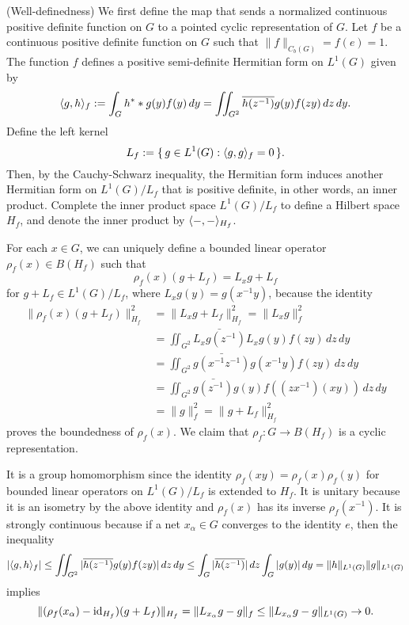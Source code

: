 \documentclass[a4paper]{article}
\begin{document}
\begin{pf}
(Well-definedness)
We first define the map that sends a normalized continuous positive definite function on $G$ to a pointed cyclic representation of $G$.
Let $f$ be a continuous positive definite function on $G$ such that $\|f\|_{C_b(G)}=f(e)=1$.
The function $f$ defines a positive semi-definite Hermitian form on $L^1(G)$ given by
\[\langle g,h\rangle_f:=\int_Gh^**g(y)f(y)\,dy=\iint_{G^2}\overline{h(z^{-1})}g(y)f(zy)\,dz\,dy.\]
Define the left kernel
\[L_f:=\{\,g\in L^1(G):\langle g,g\rangle_f=0\,\}.\]
Then, by the Cauchy-Schwarz inequality, the Hermitian form induces another Hermitian form on $L^1(G)/L_f$ that is positive definite, in other words, an inner product.
Complete the inner product space $L^1(G)/L_f$ to define a Hilbert space $H_f$, and denote the inner product by $\langle-,-\rangle_{H_f}$.

For each $x\in G$, we can uniquely define a bounded linear operator $\rho_f(x)\in B(H_f)$ such that
\[\rho_f(x)(g+L_f)=L_xg+L_f\]
for $g+L_f\in L^1(G)/L_f$, where $L_xg(y)=g(x^{-1}y)$, because the identity
\begin{align*}
\|\rho_f(x)(g+L_f)\|_{H_f}^2&=\|L_xg+L_f\|_{H_f}^2=\|L_xg\|_f^2\\
&=\iint_{G^2}\bar{L_xg(z^{-1})}L_xg(y)f(zy)\,dz\,dy\\
&=\iint_{G^2}\bar{g(x^{-1}z^{-1})}g(x^{-1}y)f(zy)\,dz\,dy\\
&=\iint_{G^2}\bar{g(z^{-1})}g(y)f((zx^{-1})(xy))\,dz\,dy\\
&=\|g\|_f^2=\|g+L_f\|_{H_f}^2
\end{align*}
proves the boundedness of $\rho_f(x)$.
We claim that $\rho_f:G\to B(H_f)$ is a cyclic representation.

It is a group homomorphism since the identity $\rho_f(xy)=\rho_f(x)\rho_f(y)$ for bounded linear operators on $L^1(G)/L_f$ is extended to $H_f$.
It is unitary because it is an isometry by the above identity and $\rho_f(x)$ has its inverse $\rho_f(x^{-1})$.
It is strongly continuous because if a net $x_\alpha\in G$ converges to the identity $e$, then the inequality
\[|\langle g,h\rangle_f|\le\iint_{G^2}|\overline{h(z^{-1})}g(y)f(zy)|\,dz\,dy\le\int_G|\overline{h(z^{-1})}|\,dz\int_G|g(y)|\,dy=\|h\|_{L^1(G)}\|g\|_{L^1(G)}\]
implies
\[\|(\rho_f(x_\alpha)-\operatorname{id}_{H_f})(g+L_f)\|_{H_f}=\|L_{x_\alpha}g-g\|_f\le\|L_{x_\alpha}g-g\|_{L^1(G)}\to0.\]


\end{pf}
\end{document}
